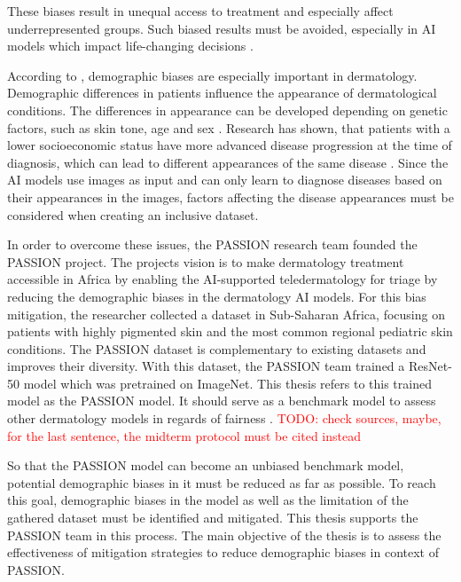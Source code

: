 \documentclass[12pt, a4paper, oneside]{book}   	%
\renewcommand{\todo}[1]{\textcolor{red}{TODO: #1}}
\begin{document}
		These biases result in unequal access to treatment and especially affect underrepresented groups. Such biased results must be avoided, especially in AI models which impact life-changing decisions \autocite{Mehrabi_2021}.
		
		According to \textcite{Diaz2022}, demographic biases are especially important in dermatology. Demographic differences in patients influence the appearance of dermatological conditions. The differences in appearance can be developed depending on genetic factors, such as skin tone, age and sex \autocite{Diaz2022}. Research has shown, that patients with a lower socioeconomic status have more advanced disease progression at the time of diagnosis, which can lead to different appearances of the same disease \autocite{BAD2021}. Since the AI models use images as input and can only learn to diagnose diseases based on their appearances in the images, factors affecting the disease appearances must be considered when creating an inclusive dataset.
		
		In order to overcome these issues, the PASSION research team founded the PASSION project. The projects vision is to make dermatology treatment accessible in Africa by enabling the AI-supported \gls{teledermatology} for triage by reducing the demographic biases in the dermatology AI models. For this bias mitigation, the researcher collected a dataset in Sub-Saharan Africa, focusing on patients with highly pigmented skin and the most common regional \gls{pediatric} skin conditions. The PASSION dataset is complementary to existing datasets and improves their diversity. With this dataset, the PASSION team trained a ResNet-50 model which was pretrained on ImageNet. This thesis refers to this trained model as the PASSION model. It should serve as a benchmark model to assess other dermatology models in regards of fairness \autocite{Gottfrois2024}. \todo{check sources, maybe, for the last sentence, the midterm protocol must be cited instead}
		
		So that the PASSION model can become an unbiased benchmark model, potential demographic biases in it must be reduced as far as possible. To reach this goal, demographic biases in the model as well as the limitation of the gathered dataset must be identified and mitigated. This thesis supports the PASSION team in this process. The main objective of the thesis is to assess the effectiveness of mitigation strategies to reduce demographic biases in context of PASSION.
		
		

	
\end{document}
